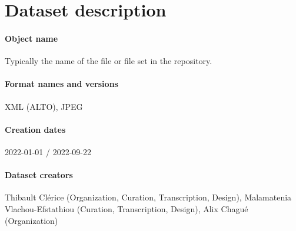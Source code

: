 \documentclass{article}
\begin{document}
\begin{table}[]
    \centering
    \caption{Datasets following the Pinche Guidelines, or adapted through Choco-Mufin. Characters' counts are rounded to the closest thousands.}
    \label{tab:datasets}
\end{table}

\section{Dataset description}

\paragraph{Object name} Typically the name of the file or file set in the repository.
\paragraph{Format names and versions} XML (ALTO), JPEG
\paragraph{Creation dates} 2022-01-01 / 2022-09-22
\paragraph{Dataset creators} Thibault Clérice (Organization, Curation, Transcription, Design), Malamatenia Vlachou-Efstathiou (Curation, Transcription, Design), Alix Chagué (Organization)
\end{document}
